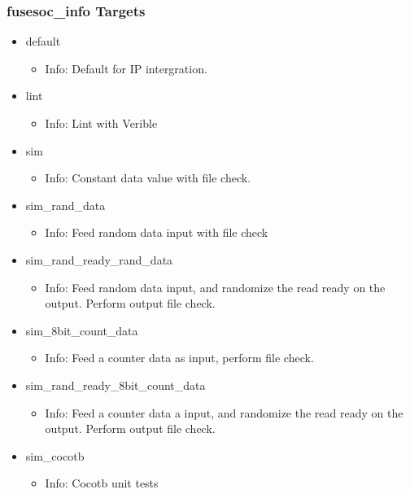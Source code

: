 \subsubsection{fusesoc\_info Targets}
\begin{itemize}
\item default
	\begin{itemize}
	\item[$\space$] Info: Default for IP intergration.
	\end{itemize}
\item lint
	\begin{itemize}
	\item[$\space$] Info: Lint with Verible
	\end{itemize}
\item sim
	\begin{itemize}
	\item[$\space$] Info: Constant data value with file check.
	\end{itemize}
\item sim\_rand\_data
	\begin{itemize}
	\item[$\space$] Info: Feed random data input with file check
	\end{itemize}
\item sim\_rand\_ready\_rand\_data
	\begin{itemize}
	\item[$\space$] Info: Feed random data input, and randomize the read ready on the output. Perform output file check.
	\end{itemize}
\item sim\_8bit\_count\_data
	\begin{itemize}
	\item[$\space$] Info: Feed a counter data as input, perform file check.
	\end{itemize}
\item sim\_rand\_ready\_8bit\_count\_data
	\begin{itemize}
	\item[$\space$] Info: Feed a counter data a input, and randomize the read ready on the output. Perform output file check.
	\end{itemize}
\item sim\_cocotb
	\begin{itemize}
	\item[$\space$] Info: Cocotb unit tests
	\end{itemize}
\end{itemize}
